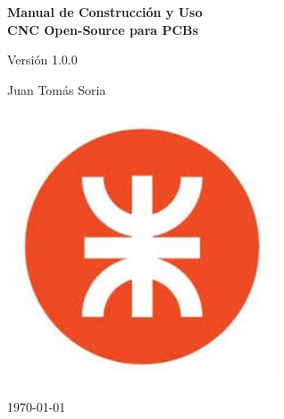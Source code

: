 \begin{titlepage}
  \centering
  \vspace*{3cm}
  {\Huge \bfseries Manual de Construcción y Uso \\\vspace{0.4cm} CNC Open-Source para PCBs \par}
  \vspace{1.5cm}
  {\Large Versión 1.0.0 \par}
  \vspace{1cm}
  {\Large Juan Tomás Soria \par}
  \vfill
  {\includegraphics[width=0.6\textwidth]{logo.jpg} \par} %
  \vfill
  {\large \today \par}
\end{titlepage}

